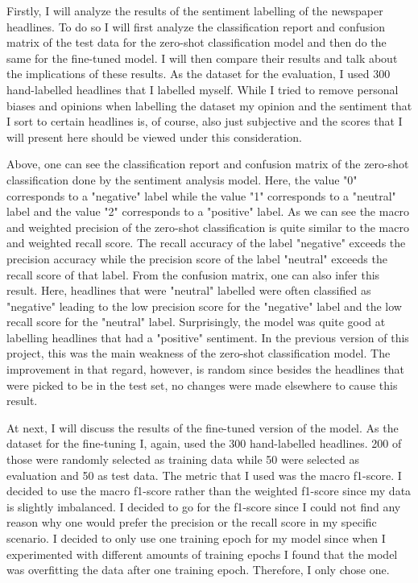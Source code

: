 \documentclass[11pt, a4paper, leqno]{article}
\begin{document}
Firstly, I will analyze the results of the sentiment labelling of the newspaper headlines. To do so I will first analyze the classification report and confusion matrix of the test data for the zero-shot classification model and then do the same for the fine-tuned model. I will then compare their results and talk about the implications of these results. As the dataset for the evaluation, I used 300 hand-labelled headlines that I labelled myself. While I tried to remove personal biases and opinions when labelling the dataset my opinion and the sentiment that I sort to certain headlines is, of course, also just subjective and the scores that I will present here should be viewed under this consideration.







Above, one can see the classification report and confusion matrix of the zero-shot classification done by the sentiment analysis model. Here, the value "0" corresponds to a "negative" label while the value "1" corresponds to a "neutral" label and the value "2" corresponds to a "positive" label.  As we can see the macro and weighted precision of the zero-shot classification is quite similar to the macro and weighted recall score. The recall accuracy of the label "negative" exceeds the precision accuracy while the precision score of the label "neutral" exceeds the recall score of that label. From the confusion matrix, one can also infer this result. Here, headlines that were "neutral" labelled were often classified as "negative" leading to the low precision score for the "negative" label and the low recall score for the "neutral" label. Surprisingly, the model was quite good at labelling headlines that had a "positive" sentiment. In the previous version of this project, this was the main weakness of the zero-shot classification model. The improvement in that regard, however, is random since besides the headlines that were picked to be in the test set, no changes were made elsewhere to cause this result.

At next, I will discuss the results of the fine-tuned version of the model. As the dataset for the fine-tuning I, again, used the 300 hand-labelled headlines. 200 of those were randomly selected as training data while 50 were selected as evaluation and 50 as test data. The metric that I used was the macro f1-score. I decided to use the macro f1-score rather than the weighted f1-score since my data is slightly imbalanced. I decided to go for the f1-score since I could not find any reason why one would prefer the precision or the recall score in my specific scenario.
I decided to only use one training epoch for my model since when I experimented with different amounts of training epochs I found that the model was overfitting the data after one training epoch. Therefore, I only chose one.
\end{document}
